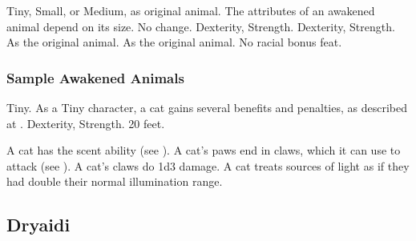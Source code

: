  Tiny, Small, or Medium, as original animal.
 The attributes of an awakened animal depend on its size.
 No change.
  Dexterity,  Strength.
  Dexterity,  Strength.
 As the original animal.
 As the original animal.
 No racial bonus feat.

\subsubsection{Sample Awakened Animals}


 Tiny. As a Tiny character, a cat gains several benefits and penalties, as described at .
  Dexterity,  Strength.
 20 feet.
\begin{itemize}
     A cat has the scent ability (see ).
     A cat's paws end in claws, which it can use to attack (see ). A cat's claws do 1d3 damage.
     A cat treats sources of light as if they had double their normal illumination range.
\end{itemize}

\begin{comment}
\subsection{Changeling}

\parhead{Size} Medium.
\parhead{Attributes} No change.
\parhead{Speed} 30 feet.
\parhead{Special Abilities}
\begin{itemize}
    \itemhead{Alter Shape} A changeling can alter its physical form in minor ways. It gains a \plus10 bonus on Disguise checks, and it can disguise its body as a standard action. This ability does not alter the changeling's equipment, which may give away its identity unless disguised normally.
\end{itemize}
\parhead{Racial Bonus Feat} Any one from the following list: Open Minded, Skill Focus (Bluff, Disguise, Intimidate, Persuasion, or Sense Motive).
\parhead{Automatic Languages} Common.
\parhead{Bonus Languages} Any.
\end{comment}

\subsection{Dryaidi}

